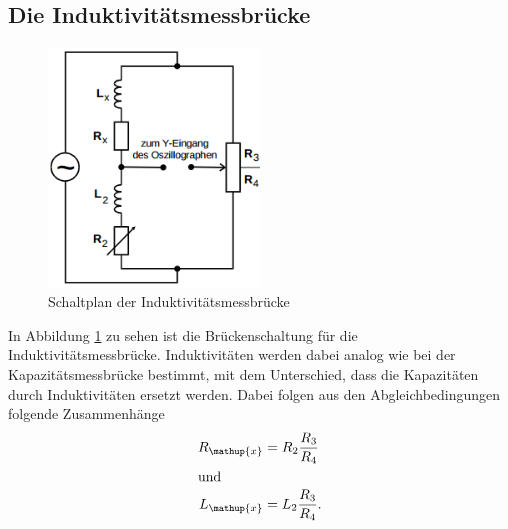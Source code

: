 \documentclass[
  bibliography=totoc,     %
  captions=tableheading,  %
  titlepage=firstiscover, %
]{scrartcl}
\begin{document}
\subsection{Die Induktivitätsmessbrücke}
\begin{figure}[htb]
  \centering
  \includegraphics[width=0.5\textwidth]{V3024.png}
  \caption{Schaltplan der Induktivitätsmessbrücke}
  \label{fig:V3024}
\end{figure}
In Abbildung \ref{fig:V3024} zu sehen ist die Brückenschaltung für die
Induktivitätsmessbrücke. Induktivitäten werden dabei analog wie bei der
Kapazitätsmessbrücke bestimmt, mit dem Unterschied, dass die Kapazitäten
durch Induktivitäten ersetzt werden. Dabei folgen aus den Abgleichbedingungen
folgende Zusammenhänge
\begin{align}
    \label{eq:induktivitätsmessbrücke_R}
    R_{\mathup{x}} &= R_2 \frac{R_3}{R_4} \\
    \shortintertext{und}
    \label{eq:induktivitätsmessbrücke_L}
    L_{\mathup{x}} &= L_2 \frac{R_3}{R_4}.
\end{align}
\newpage
\end{document}
